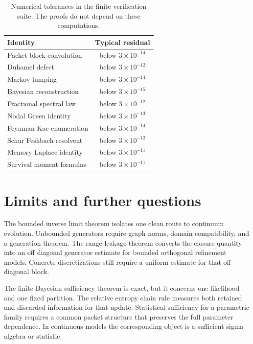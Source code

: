 \documentclass[11pt,a4paper]{article}
\theoremstyle{definition}
\theoremstyle{remark}
\begin{document}
\begin{table}[t]
\centering
\begin{tabular}{lc}
\toprule
Identity & Typical residual \\
\midrule
Packet block convolution & below \(3\times10^{-14}\) \\
Duhamel defect & below \(3\times10^{-12}\) \\
Markov lumping & below \(3\times10^{-14}\) \\
Bayesian reconstruction & below \(3\times10^{-15}\) \\
Fractional spectral law & below \(3\times10^{-12}\) \\
Nodal Green identity & below \(3\times10^{-13}\) \\
Feynman Kac enumeration & below \(3\times10^{-14}\) \\
Schur Feshbach resolvent & below \(3\times10^{-12}\) \\
Memory Laplace identity & below \(3\times10^{-11}\) \\
Survival moment formulas & below \(3\times10^{-11}\) \\
\bottomrule
\end{tabular}
\caption{Numerical tolerances in the finite verification suite. The proofs do not depend on these computations.}
\label{extended:tab:verification_tolerances}
\end{table}

\section{Limits and further questions}\label{extended:section:18}\label{extended:sec:limits}

The bounded inverse limit theorem isolates one clean route to continuum evolution. Unbounded generators require graph norms, domain compatibility, and a generation theorem. The range leakage theorem converts the closure quantity into an off diagonal generator estimate for bounded orthogonal refinement models. Concrete discretizations still require a uniform estimate for that off diagonal block.

The finite Bayesian sufficiency theorem is exact, but it concerns one likelihood and one fixed partition. The relative entropy chain rule measures both retained and discarded information for that update. Statistical sufficiency for a parametric family requires a common packet structure that preserves the full parameter dependence. In continuous models the corresponding object is a sufficient sigma algebra or statistic.
\end{document}
